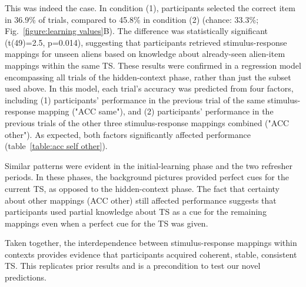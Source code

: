 \documentclass[10pt, letterpaper]{article}
\begin{document}
This was indeed the case. In condition (1), participants selected the correct item in 36.9\% of trials, compared to 45.8\% in condition (2) (chance: 33.3\%; Fig.~\ref{figure:learning values}B). The difference was statistically significant (t(49)=2.5, p=0.014), suggesting that participants retrieved stimulus-response mappings for unseen aliens based on knowledge about already-seen alien-item mappings within the same TS. These results were confirmed in a regression model encompassing all trials of the hidden-context phase, rather than just the subset used above. In this model, each trial's accuracy was predicted from four factors, including (1) participants' performance in the previous trial of the same stimulus-response mapping ("ACC same"), and (2) participants' performance in the previous trials of the other three stimulus-response mappings combined ("ACC other"). As expected, both factors significantly affected performance (table~\ref{table:acc self other}). 

Similar patterns were evident in the initial-learning phase and the two refresher periods. In these phases, the background pictures provided perfect cues for the current TS, as opposed to the hidden-context phase. The fact that certainty about other mappings (ACC other) still affected performance suggests that participants used partial knowledge about TS as a cue for the remaining mappings even when a perfect cue for the TS was given.

Taken together, the interdependence between stimulus-response mappings within contexts provides evidence that participants acquired coherent, stable, consistent TS. This replicates prior results \cite{collins_cognitive_2013} and is a precondition to test our novel predictions.
\end{document}
